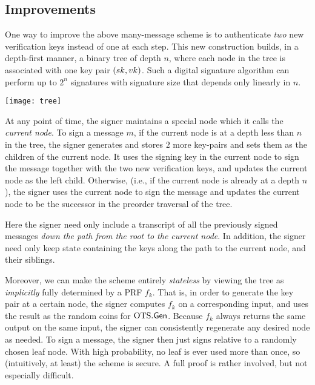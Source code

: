 \documentclass[11pt]{article}
\begin{document}
\subsection{Improvements}
\label{sec:improvements}

One way to improve the above many-message scheme is to authenticate
\emph{two} new verification keys instead of one at each step.  This
new construction builds, in a depth-first manner, a binary tree of
depth $n$, where each node in the tree is associated with one key pair
$(sk,vk)$.  Such a digital signature algorithm can perform up to
$2^n$ signatures with signature size that depends only linearly in
$n$.

\begin{center}
\texttt{[image: tree]}
\end{center}

At any point of time, the signer maintains a special node which it
calls the \emph{current node}.  To sign a message $m$, if the current
node is at a depth less than $n$ in the tree, the signer generates and
stores $2$ more key-pairs and sets them as the children of the current
node.  It uses the signing key in the current node to sign the message
together with the two new verification keys, and updates the current
node as the left child.  Otherwise, (i.e., if the current node is
already at a depth $n$), the signer uses the current node to sign the
message and updates the current node to be the successor in the
preorder traversal of the tree.

Here the signer need only include a transcript of all the previously
signed messages \emph{down the path from the root to the current
  node}.  In addition, the signer need only keep state containing the
keys along the path to the current node, and their siblings.

Moreover, we can make the scheme entirely \emph{stateless} by viewing
the tree as \emph{implicitly} fully determined by a PRF $f_{k}$.  That
is, in order to generate the key pair at a certain node, the signer
computes $f_{k}$ on a corresponding input, and uses the result as the
random coins for $\text{OTS}.\mathsf{Gen}$.  Because $f_{k}$ always returns the
same output on the same input, the signer can consistently regenerate
any desired node as needed.  To sign a message, the signer then just
signs relative to a randomly chosen leaf node.  With high probability,
no leaf is ever used more than once, so (intuitively, at least) the
scheme is secure.  A full proof is rather involved, but not especially
difficult.
\end{document}
